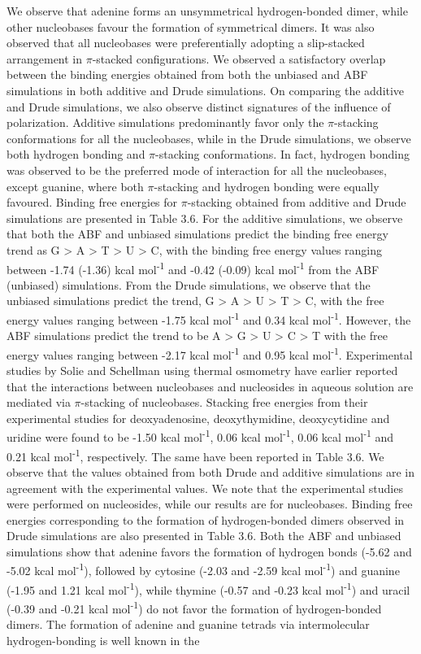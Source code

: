     We observe that adenine forms an unsymmetrical hydrogen-bonded dimer, while other nucleobases favour the formation of symmetrical dimers. It was also observed that all nucleobases were preferentially adopting a slip-stacked arrangement in $\pi$-stacked configurations. We observed a satisfactory overlap between the binding energies obtained from both the unbiased and ABF simulations in both additive and Drude simulations. On comparing the additive and Drude simulations, we also observe distinct signatures of the influence of polarization.  Additive simulations predominantly favor only the $\pi$-stacking conformations for all the nucleobases, while in the Drude simulations, we observe both hydrogen bonding and $\pi$-stacking conformations.  In fact, hydrogen bonding was observed to be the preferred mode of interaction for all the nucleobases, except guanine, where both $\pi$-stacking and hydrogen bonding were equally favoured. Binding free energies for $\pi$-stacking obtained from additive and Drude simulations are presented in Table 3.6. For the additive simulations, we observe that both the ABF and unbiased simulations predict the binding free energy trend as G > A > T > U > C, with the binding free energy values ranging between -1.74 (-1.36) kcal mol\textsuperscript{-1} and -0.42 (-0.09) kcal mol\textsuperscript{-1} from the ABF (unbiased) simulations. From the Drude simulations, we observe that the unbiased simulations predict the trend, G > A > U > T > C, with the free energy values ranging between -1.75 kcal mol\textsuperscript{-1} and 0.34 kcal mol\textsuperscript{-1}. However, the ABF simulations predict the trend to be A > G > U > C > T with the free energy values ranging between -2.17 kcal mol\textsuperscript{-1} and 0.95 kcal mol\textsuperscript{-1}. Experimental studies by Solie and Schellman using thermal osmometry have earlier reported that the interactions between nucleobases and nucleosides in aqueous solution are mediated via $\pi$-stacking of nucleobases.\supercite{solie_interaction_1968} Stacking free energies from their experimental studies for deoxyadenosine, deoxythymidine, deoxycytidine and uridine were found to be -1.50 kcal mol\textsuperscript{-1}, 0.06 kcal mol\textsuperscript{-1}, 0.06 kcal mol\textsuperscript{-1} and 0.21 kcal mol\textsuperscript{-1}, respectively. The same have been reported in Table 3.6.  We observe that the values obtained from both Drude and additive simulations are in agreement with the experimental values. We note that the experimental studies were performed on nucleosides, while our results are for nucleobases. Binding free energies corresponding to the formation of hydrogen-bonded dimers observed in Drude simulations are also presented in Table 3.6. Both the ABF and unbiased simulations show that adenine favors the formation of hydrogen bonds (-5.62 and -5.02 kcal mol\textsuperscript{-1}), followed by cytosine (-2.03 and -2.59 kcal mol\textsuperscript{-1}) and guanine (-1.95 and 1.21 kcal mol\textsuperscript{-1}), while thymine (-0.57 and -0.23 kcal mol\textsuperscript{-1}) and uracil (-0.39 and -0.21 kcal mol\textsuperscript{-1}) do not favor the formation of hydrogen-bonded dimers. The formation of adenine and guanine tetrads via intermolecular hydrogen-bonding is well known in the 